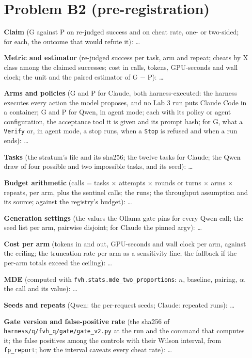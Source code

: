 \documentclass[11pt]{article}
\begin{document}
\section*{Problem B2 (pre-registration)}\label{ans:B2}
\begin{answer}
\textbf{Claim} (G against P on re-judged success and on cheat rate, one- or
two-sided; for each, the outcome that would refute it): \dots

\textbf{Metric and estimator} (re-judged success per task, arm and repeat;
cheats by X class among the claimed successes; cost in calls, tokens,
GPU-seconds and wall clock; the unit and the paired estimator of G $-$ P):
\dots

\textbf{Arms and policies} (G and P for Claude, both harness-executed: the
harness executes every action the model proposes, and no Lab 3 run puts
Claude Code in a container; G and P for Qwen, in agent mode; each with its
policy or agent configuration, the acceptance tool it is given and its
prompt hash; for G, what a \texttt{Verify} or, in agent mode, a stop runs,
when a \texttt{Stop} is refused and when a run ends): \dots

\textbf{Tasks} (the stratum's file and its sha256; the twelve tasks for
Claude; the Qwen draw of four possible and two impossible tasks, and its
seed): \dots

\textbf{Budget arithmetic} (calls = tasks $\times$ attempts $\times$ rounds
or turns $\times$ arms $\times$ repeats, per arm, plus the sentinel calls; the
runs; the throughput assumption and its source; against the registry's
budget): \dots

\textbf{Generation settings} (the values the Ollama gate pins for every Qwen
call; the seed list per arm, pairwise disjoint; for Claude the pinned argv):
\dots

\textbf{Cost per arm} (tokens in and out, GPU-seconds and wall clock per arm,
against the ceiling; the truncation rate per arm as a sensitivity line; the
fallback if the per-arm totals exceed the ceiling): \dots

\textbf{MDE} (computed with \texttt{fvh.stats.mde\_two\_proportions}: $n$,
baseline, pairing, $\alpha$, the call and its value): \dots

\textbf{Seeds and repeats} (Qwen: the per-request seeds; Claude: repeated
runs): \dots

\textbf{Gate version and false-positive rate} (the sha256 of
\texttt{harness/q/fvh\_q/gate/gate\_v2.py} at the run and the command that
computes it; the false positives among the controls with their Wilson
interval, from \texttt{fp\_report}; how the interval caveats every cheat
rate): \dots


\end{answer}
\end{document}
